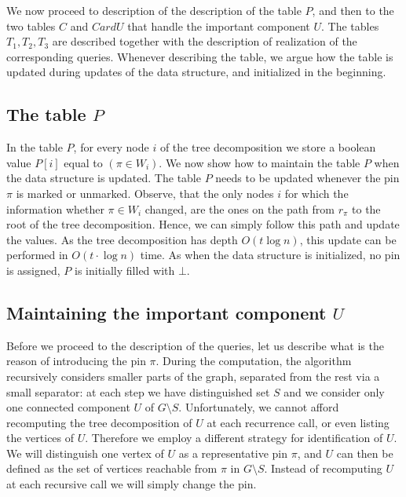 \documentclass[a4paper,11pt]{article}
\theoremstyle{definition}
\theoremstyle{remark}
\newcommand{\pin}{\pi}
\begin{document}
\vskip 0.3cm

We now proceed to description of the description of the table $P$, and
then to the two tables $C$ and $CardU$ that handle the important
component $U$.  The tables $T_1,T_2,T_3$ are described together with the
description of realization of the corresponding queries.  Whenever
describing the table, we argue how the table is updated during updates
of the data structure, and initialized in the beginning.

\subsection{The table $P$}

In the table $P$, for every node $i$ of the tree decomposition we store a
boolean value $P[i]$ equal to $(\pin\in W_i)$.  We now show how to
maintain the table $P$ when the data structure is updated. The table $P$
needs to be updated whenever the pin $\pin$ is marked or unmarked.
Observe, that the only nodes $i$ for which the information whether
$\pin\in W_i$ changed, are the ones on the path from $r_\pin$ to the
root of the tree decomposition.  Hence, we can simply follow this path
and update the values.  As the tree decomposition has depth $O(t\log
n)$, this update can be performed in $O(t\cdot \log n)$ time.  As when
the data structure is initialized, no pin is assigned, $P$ is
initially filled with $\bot$.

\subsection{Maintaining the important component $U$}

Before we proceed to the description of the queries, let us describe
what is the reason of introducing the pin $\pin$.  During the
computation, the algorithm recursively considers smaller parts of the
graph, separated from the rest via a small separator: at each step we
have distinguished set $S$ and we consider only one connected
component $U$ of $G\setminus S$.  Unfortunately, we cannot afford
recomputing the tree decomposition of $U$ at each recurrence call, or
even listing the vertices of $U$.  Therefore we employ a different
strategy for identification of $U$.  We will distinguish one vertex of
$U$ as a representative pin $\pin$, and $U$ can then be defined as the
set of vertices reachable from $\pin$ in $G\setminus S$.  Instead of
recomputing $U$ at each recursive call we will simply change the
pin.
\end{document}

